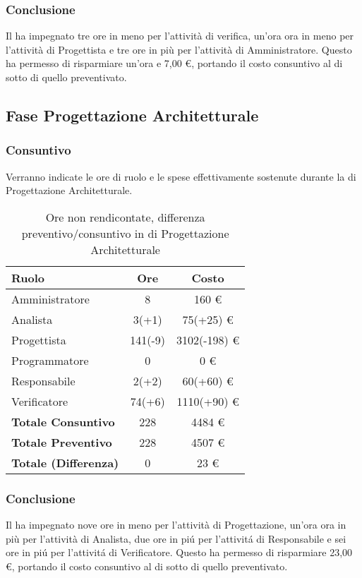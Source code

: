 \subsubsection{Conclusione}
Il  ha impegnato tre ore in meno per l'attivit\`a di verifica, un'ora ora in meno per l'attivit\`a di Progettista e tre ore in più per l'attivit\`a di Amministratore. Questo ha permesso di risparmiare un'ora e 7,00 \euro{}, portando il costo consuntivo al di sotto di quello preventivato.

\newpage


\subsection{Fase Progettazione Architetturale}
\subsubsection{Consuntivo}
Verranno indicate le ore di ruolo e le spese effettivamente sostenute durante la  di Progettazione Architetturale.

\begin{table}[H]
	\centering
	\begin{tabular}{ l c c }
		\textbf{Ruolo} & \textbf{Ore} & \textbf{Costo} \\
		\hline
		Amministratore & 8 & 160 \euro{} \\
		Analista & 3(+1) & 75(+25) \euro{} \\
		Progettista & 141(-9) & 3102(-198) \euro{} \\
		Programmatore & 0 & 0 \euro{} \\
		Responsabile & 2(+2) & 60(+60) \euro{} \\
		Verificatore & 74(+6) & 1110(+90) \euro{} \\
		\hline
		\textbf{Totale Consuntivo} & 228 & 4484 \euro{} \\
		\hline
		\textbf{Totale Preventivo} & 228 & 4507 \euro{} \\
		\hline
		\textbf{Totale (Differenza)} & 0 & 23 \euro{} \\
		\hline
	\end{tabular}
	\caption{Ore non rendicontate, differenza preventivo/consuntivo in  di Progettazione Architetturale}
\end{table}



\subsubsection{Conclusione}
Il  ha impegnato nove ore in meno per l'attivit\`a di Progettazione, un'ora ora in più per l'attivit\`a di Analista, due ore in pi\'u per l'attivit\'a di Responsabile e sei ore in pi\'u per l'attivit\'a di Verificatore. Questo ha permesso di risparmiare 23,00 \euro{}, portando il costo consuntivo al di sotto di quello preventivato.
